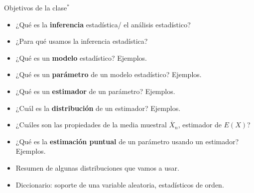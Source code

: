 \documentclass{beamer}
\theoremstyle{definition}
\begin{document}
\begin{frame}{\color{rosee}Objetivos de la clase${}^*$}
    \begin{itemize}
    \item ¿Qué es la \textbf{inferencia} estadística/ el análisis estadístico?
        \item ¿Para qué usamos la inferencia estadística?
        \item ¿Qué es un \textbf{modelo} estadístico? Ejemplos.
        \item ¿Qué es un \textbf{parámetro} de un modelo estadístico? Ejemplos.
        \item ¿Qué es un \textbf{estimador} de un parámetro? Ejemplos.
        \item ¿Cuál es la \textbf{distribución} de un estimador? Ejemplos.
        \item ¿Cuáles son las propiedades de la media muestral $\overline{X}_n$, estimador de $E(X)$? 
        \item ¿Qué es la \textbf{estimación puntual} de un parámetro usando un estimador? Ejemplos.
        \item Resumen de algunas distribuciones que vamos a usar.
        \item Diccionario: soporte de una variable aleatoria, estadísticos de orden.
    \end{itemize}
\end{frame}



\end{document}
